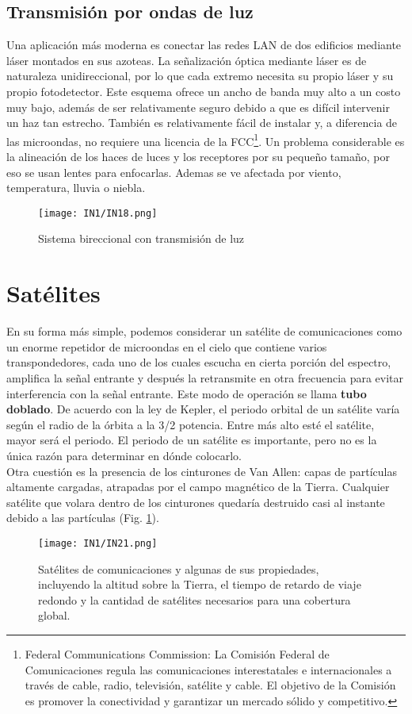 \documentclass[
	12pt, %
	fleqn, %
	a4paper, %
]{LegrandOrangeBook}
\begin{document}
\subsection{Transmisión por ondas de luz}
Una aplicación más moderna es conectar las redes LAN de dos edificios mediante láser montados en sus azoteas. La señalización óptica mediante láser es de naturaleza unidireccional, por lo que
cada extremo necesita su propio láser y su propio fotodetector. Este esquema ofrece un ancho de banda muy alto a un costo muy bajo, además de ser relativamente seguro debido a que es difícil intervenir un haz tan estrecho. También es relativamente fácil de instalar y, a diferencia de las microondas, no requiere una licencia de la FCC\footnote{Federal Communications Commission: La Comisión Federal de Comunicaciones regula las comunicaciones interestatales e internacionales a través de cable, radio, televisión, satélite y cable. El objetivo de la Comisión es promover la conectividad y garantizar un mercado sólido y competitivo.}. Un problema considerable es la alineación de los haces de luces y los receptores por su pequeño tamaño, por eso se usan lentes para enfocarlas. Ademas se ve afectada por viento, temperatura, lluvia o niebla.
\begin{figure}[H]
\centering
\texttt{[image: IN1/IN18.png]}
\caption{Sistema bireccional con transmisión de luz}
\end{figure}
\section{Satélites}
En su forma más simple, podemos considerar un satélite de comunicaciones como un enorme repetidor de microondas en el cielo que contiene varios transpondedores, cada uno de los cuales escucha en cierta porción del espectro, amplifica la señal entrante y después la retransmite en otra frecuencia para evitar interferencia con la señal entrante. Este modo de operación se llama \textbf{tubo doblado}. De acuerdo con la ley de Kepler, el periodo orbital de un satélite varía según el radio de la órbita a la 3/2 potencia. Entre más alto esté el satélite, mayor será el periodo. El periodo de un satélite es importante, pero no es la única razón para determinar en dónde colocarlo.\\
Otra cuestión es la presencia de los cinturones de Van Allen: capas de partículas altamente cargadas, atrapadas por el campo magnético de la Tierra. Cualquier satélite que volara dentro de los cinturones quedaría destruido casi al instante debido a las partículas (Fig. \ref{fig: satelites prop}).
\begin{figure}[]
\centering
\texttt{[image: IN1/IN21.png]}
\caption{Satélites de comunicaciones y algunas de sus propiedades, incluyendo la altitud sobre la Tierra, el tiempo de retardo de viaje redondo y la cantidad de satélites necesarios para una cobertura global.}
\label{fig: satelites prop}
\end{figure}
\end{document}

